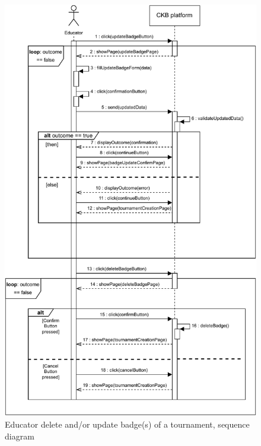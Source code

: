 \documentclass{article}
\begin{document}
{\begin{enumerate}
\begin{xltabular}{\textwidth}
\begin{itemize}
                                                \end{itemize}
                    \end{xltabular}
                    
                    \begin{figure}[H]
                        \centering
                        \includegraphics[scale=0.95]{SequenceDiagrams/Sequence5.pdf}
                        \caption{Educator delete and/or update badge(s) of a tournament, sequence diagram}
                        \label{fig:DeletionUpdateBadgesSeqDiagram}
                    \end{figure}


\end{enumerate}}
\end{document}
